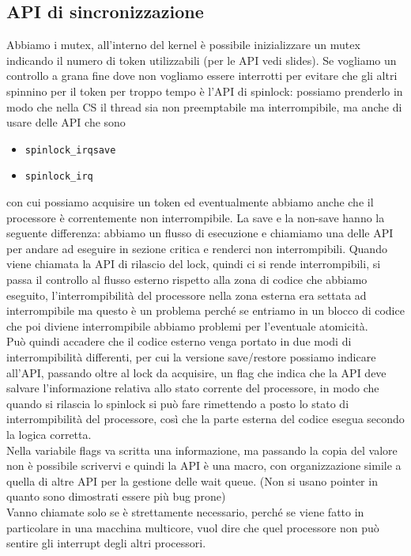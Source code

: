 \documentclass[12pt, oneside]{extbook}
\begin{document}
\subsection{API di sincronizzazione}
Abbiamo i mutex, all'interno del kernel è possibile inizializzare un mutex indicando il numero di token utilizzabili (per le API vedi slides). Se vogliamo un controllo a grana fine dove non vogliamo essere interrotti per evitare che gli altri spinnino per il token per troppo tempo è l'API di spinlock: possiamo prenderlo in modo che nella CS il thread sia non preemptabile ma interrompibile, ma anche di usare delle API che sono
\begin{itemize}
\item \texttt{spinlock\_irqsave}
\item \texttt{spinlock\_irq}
\end{itemize}
con cui possiamo acquisire un token ed eventualmente abbiamo anche che il processore è correntemente non interrompibile. La save e la non-save hanno la seguente differenza: abbiamo un flusso di esecuzione e chiamiamo una delle API per andare ad eseguire in sezione critica e renderci non interrompibili. Quando viene chiamata la API di rilascio del lock, quindi ci si rende interrompibili, si passa il controllo al flusso esterno rispetto alla zona di codice che abbiamo eseguito, l'interrompibilità del processore nella zona esterna era settata ad interrompibile ma questo è un problema perché se entriamo in un blocco di codice che poi diviene interrompibile abbiamo problemi per l'eventuale atomicità.\\Può quindi accadere che il codice esterno venga portato in due modi di interrompibilità differenti, per cui la versione save/restore possiamo indicare all'API, passando oltre al lock da acquisire, un flag che indica che la API deve salvare l'informazione relativa allo stato corrente del processore, in modo che quando si rilascia lo spinlock si può fare rimettendo a posto lo stato di interrompibilità del processore, così che la parte esterna del codice esegua secondo la logica corretta.\\Nella variabile flags va scritta una informazione, ma passando la copia del valore non è possibile scrivervi e quindi la API è una macro, con organizzazione simile a quella di altre API per la gestione delle wait queue. (Non si usano pointer in quanto sono dimostrati essere più bug prone)\\Vanno chiamate solo se è strettamente necessario, perché se viene fatto in particolare in una macchina multicore, vuol dire che quel processore non può sentire gli interrupt degli altri processori.
\end{document}
